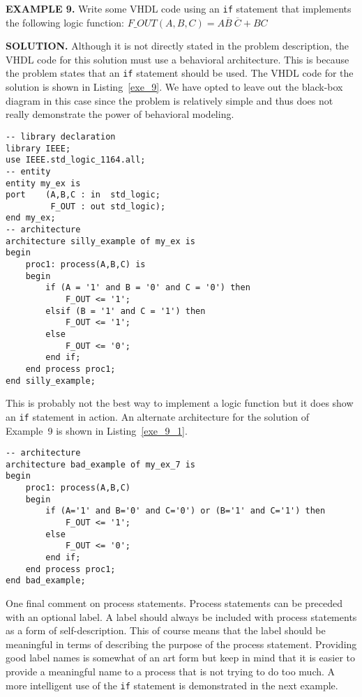 \begin{leftbar}
\noindent
\textbf{EXAMPLE 9.}
Write some VHDL code  using an \texttt{if} statement that implements the following logic function:
$F\_OUT(A,B,C)=A\overline{B}~\!\overline{C}+BC$
\end{leftbar}
\noindent
\textbf{SOLUTION.} Although it is not directly stated in the problem description, the VHDL code for this solution must use a behavioral architecture. This is because the problem states that an \texttt{if} statement should be used. The VHDL code for the solution is shown in Listing~\ref{exe_9}. We have opted to leave out the black-box diagram in this case since the problem is relatively simple and thus does not really demonstrate the power of behavioral modeling.

\noindent
\begin{minipage}{0.99\linewidth}
\begin{lstlisting}[label=exe_9, caption=Solution to Example~9.]
-- library declaration
library IEEE;
use IEEE.std_logic_1164.all;
-- entity
entity my_ex is
port 	(A,B,C : in  std_logic;
	 	 F_OUT : out std_logic);
end my_ex;
-- architecture
architecture silly_example of my_ex is
begin
	proc1: process(A,B,C) is
	begin
		if (A = '1' and B = '0' and C = '0') then
	   		F_OUT <= '1';
		elsif (B = '1' and C = '1') then
	   		F_OUT <= '1';
		else
	   		F_OUT <= '0';
		end if;
	end process proc1;
end silly_example;
\end{lstlisting}
\end{minipage}

This is probably not the best way to implement a logic function but it does show an \texttt{if} statement in action. An alternate architecture for the solution of Example~9 is shown in Listing~\ref{exe_9_1}.

\noindent
\begin{minipage}{0.99\linewidth}
\begin{lstlisting}[label=exe_9_1, caption=Alternative solution to Example~9.]
-- architecture
architecture bad_example of my_ex_7 is
begin
	proc1: process(A,B,C)
	begin
		if (A='1' and B='0' and C='0') or (B='1' and C='1') then
	   		F_OUT <= '1';
		else
	   		F_OUT <= '0';
		end if;
	end process proc1;
end bad_example;
\end{lstlisting}
\end{minipage}

One final comment on process statements. Process statements can be preceded with an optional label. A label should always be included with process statements as a form of self-description. This of course means that the label should be meaningful in terms of describing the purpose of the process statement. Providing good label names is somewhat of an art form but keep in mind that it is easier to provide a meaningful name to a process that is not trying to do too much. A more intelligent use of the \texttt{if} statement is demonstrated in the next example.


